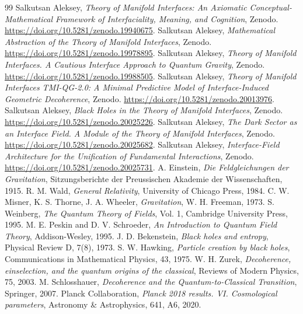 \documentclass[12pt,a4paper]{article}
\begin{document}
\begin{thebibliography}{99}
 Salkutsan Aleksey, \textit{Theory of Manifold Interfaces: An Axiomatic Conceptual-Mathematical Framework of Interfaciality, Meaning, and Cognition}, Zenodo. \href{https://doi.org/10.5281/zenodo.19940675}{https://doi.org/10.5281/zenodo.19940675}.
 Salkutsan Aleksey, \textit{Mathematical Abstraction of the Theory of Manifold Interfaces}, Zenodo. \href{https://doi.org/10.5281/zenodo.19978895}{https://doi.org/10.5281/zenodo.19978895}.
 Salkutsan Aleksey, \textit{Theory of Manifold Interfaces. A Cautious Interface Approach to Quantum Gravity}, Zenodo. \href{https://doi.org/10.5281/zenodo.19988505}{https://doi.org/10.5281/zenodo.19988505}.
 Salkutsan Aleksey, \textit{Theory of Manifold Interfaces TMI-QG-2.0: A Minimal Predictive Model of Interface-Induced Geometric Decoherence}, Zenodo. \href{https://doi.org/10.5281/zenodo.20013976}{https://doi.org/10.5281/zenodo.20013976}.
 Salkutsan Aleksey, \textit{Black Holes in the Theory of Manifold Interfaces}, Zenodo. \href{https://doi.org/10.5281/zenodo.20025226}{https://doi.org/10.5281/zenodo.20025226}.
 Salkutsan Aleksey, \textit{The Dark Sector as an Interface Field. A Module of the Theory of Manifold Interfaces}, Zenodo. \href{https://doi.org/10.5281/zenodo.20025682}{https://doi.org/10.5281/zenodo.20025682}.
 Salkutsan Aleksey, \textit{Interface-Field Architecture for the Unification of Fundamental Interactions}, Zenodo. \href{https://doi.org/10.5281/zenodo.20025731}{https://doi.org/10.5281/zenodo.20025731}.
 A. Einstein, \textit{Die Feldgleichungen der Gravitation}, Sitzungsberichte der Preussischen Akademie der Wissenschaften, 1915.
 R. M. Wald, \textit{General Relativity}, University of Chicago Press, 1984.
 C. W. Misner, K. S. Thorne, J. A. Wheeler, \textit{Gravitation}, W. H. Freeman, 1973.
 S. Weinberg, \textit{The Quantum Theory of Fields}, Vol. 1, Cambridge University Press, 1995.
 M. E. Peskin and D. V. Schroeder, \textit{An Introduction to Quantum Field Theory}, Addison-Wesley, 1995.
 J. D. Bekenstein, \textit{Black holes and entropy}, Physical Review D, 7(8), 1973.
 S. W. Hawking, \textit{Particle creation by black holes}, Communications in Mathematical Physics, 43, 1975.
 W. H. Zurek, \textit{Decoherence, einselection, and the quantum origins of the classical}, Reviews of Modern Physics, 75, 2003.
 M. Schlosshauer, \textit{Decoherence and the Quantum-to-Classical Transition}, Springer, 2007.
 Planck Collaboration, \textit{Planck 2018 results. VI. Cosmological parameters}, Astronomy \& Astrophysics, 641, A6, 2020.
\end{thebibliography}
\end{document}
